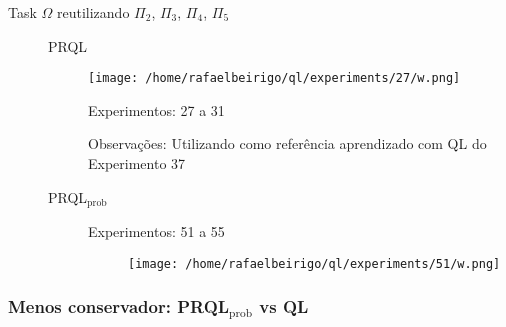 \documentclass[11pt]{article}
\begin{document}
\begin{description}

\item[Task $\Omega$ reutilizando $\Pi$$_2$, $\Pi$$_3$, $\Pi$$_4$, $\Pi$$_5$]\label{sec-11.1.1.2}


\begin{description}

\item[PRQL]\label{sec-11.1.1.2.1}


\centerline{\texttt{[image: /home/rafaelbeirigo/ql/experiments/27/w.png]}}


\begin{description}

\item[Experimentos: 27 a 31]\label{sec-11.1.1.2.1.1}


\end{description}
\begin{description}

\item[Observações: Utilizando como referência aprendizado com QL do Experimento 37]\label{sec-11.1.1.2.1.2}




\end{description}
\end{description}
\begin{description}

\item[PRQL$_{\mathrm{prob}}$]\label{sec-11.1.1.2.2}


\begin{description}

\item[Experimentos: 51 a 55]\label{sec-11.1.1.2.2.1}


\centerline{\texttt{[image: /home/rafaelbeirigo/ql/experiments/51/w.png]}}



\end{description}
\end{description}
\end{description}
\subsubsection{Menos conservador: PRQL$_{\mathrm{prob}}$ vs QL}
\label{sec-11.1.2}
\end{document}
